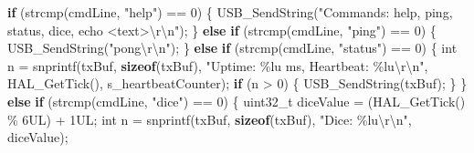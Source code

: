 \documentclass[
  chinese,
  UTF8,
  oneside,
  openany]{ctexbook}
\newenvironment{Shaded}{}{}
\newcommand{\BuiltInTok}[1]{\textcolor[rgb]{0.00,0.50,0.00}{#1}}
\newcommand{\ControlFlowTok}[1]{\textcolor[rgb]{0.00,0.44,0.13}{\textbf{#1}}}
\newcommand{\DataTypeTok}[1]{\textcolor[rgb]{0.56,0.13,0.00}{#1}}
\newcommand{\DecValTok}[1]{\textcolor[rgb]{0.25,0.63,0.44}{#1}}
\newcommand{\KeywordTok}[1]{\textcolor[rgb]{0.00,0.44,0.13}{\textbf{#1}}}
\newcommand{\NormalTok}[1]{#1}
\newcommand{\OperatorTok}[1]{\textcolor[rgb]{0.40,0.40,0.40}{#1}}
\newcommand{\SpecialCharTok}[1]{\textcolor[rgb]{0.25,0.44,0.63}{#1}}
\newcommand{\StringTok}[1]{\textcolor[rgb]{0.25,0.44,0.63}{#1}}
\begin{document}
\begin{Shaded}
\begin{Highlighting}[]
    \ControlFlowTok{if} \OperatorTok{(}\NormalTok{strcmp}\OperatorTok{(}\NormalTok{cmdLine}\OperatorTok{,} \StringTok{"help"}\OperatorTok{)} \OperatorTok{==} \DecValTok{0}\OperatorTok{)}
    \OperatorTok{\{}
\NormalTok{        USB\_SendString}\OperatorTok{(}\StringTok{"Commands: help, ping, status, dice, echo \textless{}text\textgreater{}}\SpecialCharTok{\textbackslash{}r\textbackslash{}n}\StringTok{"}\OperatorTok{);}
    \OperatorTok{\}}
    \ControlFlowTok{else} \ControlFlowTok{if} \OperatorTok{(}\NormalTok{strcmp}\OperatorTok{(}\NormalTok{cmdLine}\OperatorTok{,} \StringTok{"ping"}\OperatorTok{)} \OperatorTok{==} \DecValTok{0}\OperatorTok{)}
    \OperatorTok{\{}
\NormalTok{        USB\_SendString}\OperatorTok{(}\StringTok{"pong}\SpecialCharTok{\textbackslash{}r\textbackslash{}n}\StringTok{"}\OperatorTok{);}
    \OperatorTok{\}}
    \ControlFlowTok{else} \ControlFlowTok{if} \OperatorTok{(}\NormalTok{strcmp}\OperatorTok{(}\NormalTok{cmdLine}\OperatorTok{,} \StringTok{"status"}\OperatorTok{)} \OperatorTok{==} \DecValTok{0}\OperatorTok{)}
    \OperatorTok{\{}
        \DataTypeTok{int}\NormalTok{ n }\OperatorTok{=}\NormalTok{ snprintf}\OperatorTok{(}\NormalTok{txBuf}\OperatorTok{,} \KeywordTok{sizeof}\OperatorTok{(}\NormalTok{txBuf}\OperatorTok{),}
                                         \StringTok{"Uptime: }\SpecialCharTok{\%lu}\StringTok{ ms, Heartbeat: }\SpecialCharTok{\%lu\textbackslash{}r\textbackslash{}n}\StringTok{"}\OperatorTok{,}
\NormalTok{                                         HAL\_GetTick}\OperatorTok{(),}\NormalTok{ s\_heartbeatCounter}\OperatorTok{);}
        \ControlFlowTok{if} \OperatorTok{(}\NormalTok{n }\OperatorTok{\textgreater{}} \DecValTok{0}\OperatorTok{)}
        \OperatorTok{\{}
\NormalTok{            USB\_SendString}\OperatorTok{(}\NormalTok{txBuf}\OperatorTok{);}
        \OperatorTok{\}}
    \OperatorTok{\}}
    \ControlFlowTok{else} \ControlFlowTok{if} \OperatorTok{(}\NormalTok{strcmp}\OperatorTok{(}\NormalTok{cmdLine}\OperatorTok{,} \StringTok{"dice"}\OperatorTok{)} \OperatorTok{==} \DecValTok{0}\OperatorTok{)}
    \OperatorTok{\{}
        \DataTypeTok{uint32\_t}\NormalTok{ diceValue }\OperatorTok{=} \OperatorTok{(}\NormalTok{HAL\_GetTick}\OperatorTok{()} \OperatorTok{\%} \DecValTok{6}\BuiltInTok{UL}\OperatorTok{)} \OperatorTok{+} \DecValTok{1}\BuiltInTok{UL}\OperatorTok{;}
        \DataTypeTok{int}\NormalTok{ n }\OperatorTok{=}\NormalTok{ snprintf}\OperatorTok{(}\NormalTok{txBuf}\OperatorTok{,} \KeywordTok{sizeof}\OperatorTok{(}\NormalTok{txBuf}\OperatorTok{),} \StringTok{"Dice: }\SpecialCharTok{\%lu\textbackslash{}r\textbackslash{}n}\StringTok{"}\OperatorTok{,}\NormalTok{ diceValue}\OperatorTok{);}

\end{Highlighting}
\end{Shaded}
\end{document}
